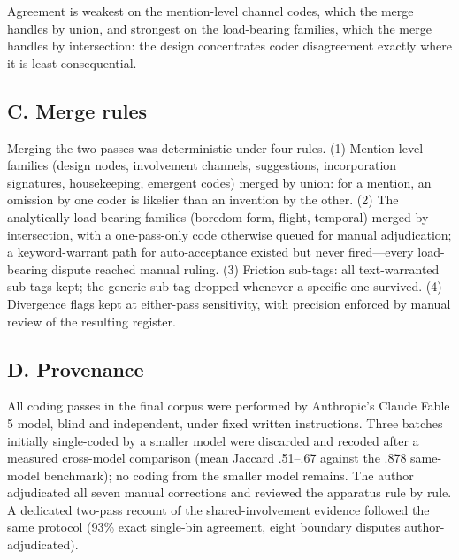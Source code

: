 
Agreement is weakest on the mention-level channel codes, which the merge
handles by union, and strongest on the load-bearing families, which the merge
handles by intersection: the design concentrates coder disagreement exactly
where it is least consequential.

\subsection*{C. Merge rules}

Merging the two passes was deterministic under four rules. (1) Mention-level
families (design nodes, involvement channels, suggestions, incorporation
signatures, housekeeping, emergent codes) merged by union: for a mention, an
omission by one coder is likelier than an invention by the other. (2) The
analytically load-bearing families (boredom-form, flight, temporal) merged by
intersection, with a one-pass-only code otherwise queued for manual
adjudication; a keyword-warrant path for auto-acceptance existed but never
fired---every load-bearing dispute reached manual ruling. (3) Friction
sub-tags: all text-warranted sub-tags kept; the generic sub-tag dropped
whenever a specific one survived. (4) Divergence flags kept at either-pass
sensitivity, with precision enforced by manual review of the resulting
register.

\subsection*{D. Provenance}

All coding passes in the final corpus were performed by Anthropic's Claude
Fable 5 model, blind and independent, under fixed written instructions.
Three batches initially single-coded by a smaller model were discarded and
recoded after a measured cross-model comparison (mean Jaccard .51--.67 against
the .878 same-model benchmark); no coding from the smaller model remains. The
author adjudicated all seven manual corrections and reviewed the apparatus
rule by rule. A dedicated two-pass recount of the shared-involvement evidence
followed the same protocol (93\% exact single-bin agreement, eight boundary
disputes author-adjudicated).
